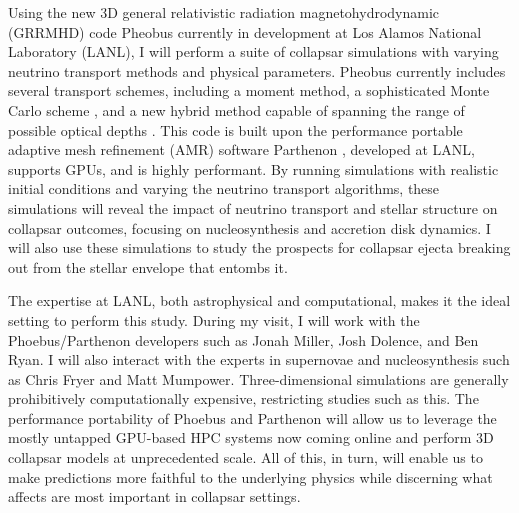 \documentclass[12pt]{article}
\begin{document}
Using the new 3D general relativistic radiation magnetohydrodynamic (GRRMHD) code Pheobus currently in development at Los Alamos National Laboratory (LANL), I will  perform a suite of collapsar simulations with varying neutrino transport methods and physical parameters.
Pheobus currently includes several transport schemes, including a moment method, a sophisticated Monte Carlo scheme \citep{nubhlight}, and a new hybrid method capable of spanning the range of possible optical depths \citep{MOCMC}.
This code is built upon the performance portable adaptive mesh refinement (AMR) software Parthenon \citep{grete:2022}, developed at LANL, supports GPUs, and is highly performant.
By running simulations with realistic initial conditions and varying the neutrino transport algorithms, these simulations will
reveal the impact of neutrino transport and stellar structure on collapsar outcomes, focusing on nucleosynthesis and accretion disk dynamics.
I will also use these simulations to study the prospects for collapsar ejecta breaking out from the stellar envelope that entombs it.

The expertise at LANL, both astrophysical and computational, makes it the ideal setting to perform this study. 
During my visit, I will work with the Phoebus/Parthenon developers such as Jonah Miller, Josh Dolence, and Ben Ryan. I will also interact with the experts in supernovae and nucleosynthesis such as Chris Fryer and Matt Mumpower.
Three-dimensional simulations are generally prohibitively computationally expensive, restricting studies such as this.
The performance portability of Phoebus and Parthenon will allow us to leverage the mostly untapped GPU-based HPC systems now coming online and perform 3D collapsar models at unprecedented scale.
All of this, in turn, will enable us to make predictions more faithful to the underlying physics while discerning what affects are most important in collapsar settings.
\end{document}

